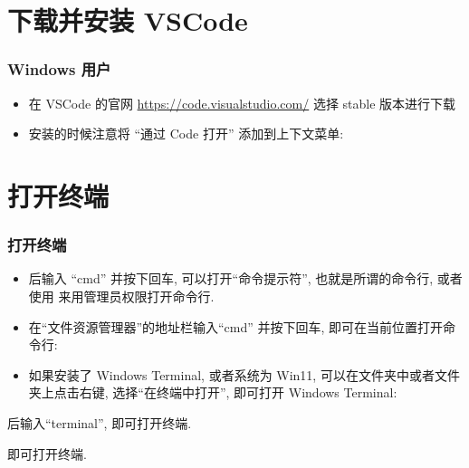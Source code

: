 \section{下载并安装 VSCode}
\begin{frame}[fragile]
  \frametitle{Windows 用户}
  \begin{itemize}[<+->]
    \item 在 VSCode 的官网 \href{https://code.visualstudio.com/}{https://code.visualstudio.com/} 选择 stable 版本进行下载
    \item 安装的时候注意将 ``通过 Code 打开'' 添加到上下文菜单:
  \end{itemize}
\end{frame}

\section{打开终端}

\begin{frame}[t]
  \frametitle{打开终端}
  \begin{description}[<+->]
    \item[WindowS 用户] 
    \begin{itemize}[<+->]
      \item {} 后输入 ``cmd'' 并按下回车, 可以打开``命令提示符'', 也就是所谓的命令行, 或者使用 \keys{\ctrl + \shift + \enter} 来用管理员权限打开命令行.
      \item 在``文件资源管理器''的地址栏输入``cmd'' 并按下回车, 即可在当前位置打开命令行:
      \item 如果安装了 Windows Terminal, 或者系统为 Win11, 可以在文件夹中或者文件夹上点击右键, 选择``在终端中打开'', 即可打开 Windows Terminal:
    \end{itemize}
    \item[macOS 用户] \keys{\cmdmac + \SPACE} 后输入``terminal'', 即可打开终端. 
    \item[Linux 用户]  即可打开终端. 
  \end{description}
\end{frame}

